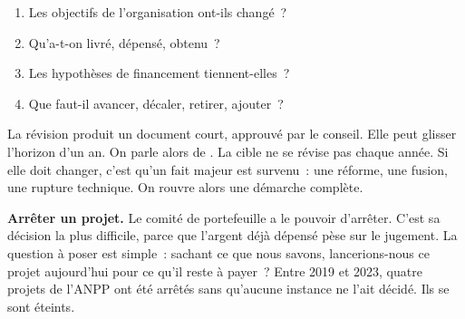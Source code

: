 \begin{enumerate}
    \item Les objectifs de l'organisation ont-ils changé~?
    \item Qu'a-t-on livré, dépensé, obtenu~?
    \item Les hypothèses de financement tiennent-elles~?
    \item Que faut-il avancer, décaler, retirer, ajouter~?
\end{enumerate}

La révision produit un document court, approuvé par le conseil. Elle peut glisser l'horizon d'un an. On parle
alors de . La cible ne se révise pas chaque année. Si elle doit changer,
c'est qu'un fait majeur est survenu~: une réforme, une fusion, une rupture technique. On rouvre alors une
démarche complète.

\begin{boxinfo}
\textbf{Arrêter un projet.} Le comité de portefeuille a le pouvoir d'arrêter. C'est sa décision la plus
difficile, parce que l'argent déjà dépensé pèse sur le jugement. La question à poser est simple~: sachant ce
que nous savons, lancerions-nous ce projet aujourd'hui pour ce qu'il reste à payer~? Entre 2019 et 2023, quatre
projets de l'ANPP ont été arrêtés sans qu'aucune instance ne l'ait décidé. Ils se sont éteints.
\end{boxinfo}

